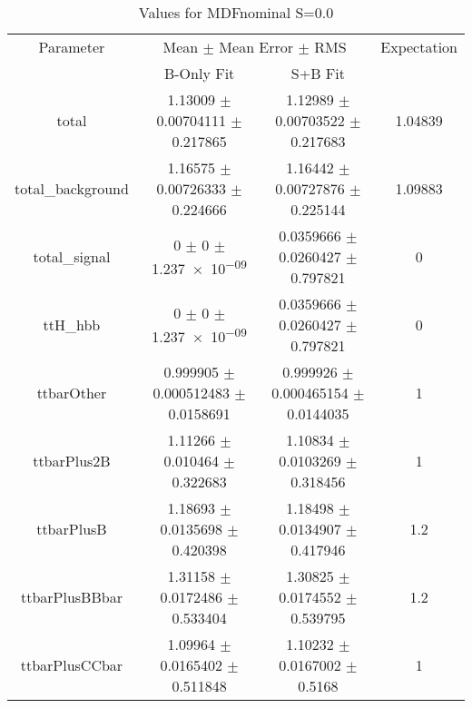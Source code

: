 \begin{table}
\centering
\caption{Values for MDFnominal S=0.0}
\begin{tabular}{cccc}
\toprule
Parameter & \multicolumn{2}{c}{Mean $\pm$ Mean Error $\pm$ RMS} & Expectation\\
 & B-Only Fit & S+B Fit & \\
\midrule
total & \num{1.13009} $\pm$ \num{0.00704111} $\pm$ \num{0.217865} & \num{1.12989} $\pm$ \num{0.00703522} $\pm$ \num{0.217683} & \num{1.04839}\\
total\_background & \num{1.16575} $\pm$ \num{0.00726333} $\pm$ \num{0.224666} & \num{1.16442} $\pm$ \num{0.00727876} $\pm$ \num{0.225144} & \num{1.09883}\\
total\_signal & \num{0} $\pm$ \num{0} $\pm$ \num{1.237e-09} & \num{0.0359666} $\pm$ \num{0.0260427} $\pm$ \num{0.797821} & \num{0}\\
ttH\_hbb & \num{0} $\pm$ \num{0} $\pm$ \num{1.237e-09} & \num{0.0359666} $\pm$ \num{0.0260427} $\pm$ \num{0.797821} & \num{0}\\
ttbarOther & \num{0.999905} $\pm$ \num{0.000512483} $\pm$ \num{0.0158691} & \num{0.999926} $\pm$ \num{0.000465154} $\pm$ \num{0.0144035} & \num{1}\\
ttbarPlus2B & \num{1.11266} $\pm$ \num{0.010464} $\pm$ \num{0.322683} & \num{1.10834} $\pm$ \num{0.0103269} $\pm$ \num{0.318456} & \num{1}\\
ttbarPlusB & \num{1.18693} $\pm$ \num{0.0135698} $\pm$ \num{0.420398} & \num{1.18498} $\pm$ \num{0.0134907} $\pm$ \num{0.417946} & \num{1.2}\\
ttbarPlusBBbar & \num{1.31158} $\pm$ \num{0.0172486} $\pm$ \num{0.533404} & \num{1.30825} $\pm$ \num{0.0174552} $\pm$ \num{0.539795} & \num{1.2}\\
ttbarPlusCCbar & \num{1.09964} $\pm$ \num{0.0165402} $\pm$ \num{0.511848} & \num{1.10232} $\pm$ \num{0.0167002} $\pm$ \num{0.5168} & \num{1}\\
\bottomrule
\end{tabular}
\end{table}